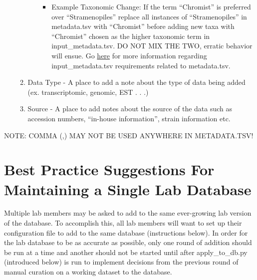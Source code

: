 \documentclass{article}
\begin{document}
\begin{itemize}
\begin{enumerate}
\begin{itemize}
                        \begin{itemize}
                            \item Example Taxonomic Change: If the term “Chromist” is preferred over “Stramenopiles” replace all instances of “Stramenopiles” in metadata.tsv with “Chromist” before adding new taxa with “Chromist” chosen as the higher taxonomic term in input\_metadata.tsv. DO NOT MIX THE TWO, erratic behavior will ensue. Go \hyperref[sec:inmeta]{here} for more information regarding input\_metadata.tsv requirements related to metadata.tsv. 
                            \end{itemize}
                    \end{itemize}
                \item Data Type - A place to add a note about the type of data being added (ex. transcriptomic, genomic, EST . . .)
                \item Source - A place to add notes about the source of the data such as accession numbers, “in-house information”, strain information etc. 
            \end{enumerate}
    \end{itemize}
     NOTE: COMMA (,) MAY NOT BE USED ANYWHERE IN METADATA.TSV!
    

    \section{Best Practice Suggestions For Maintaining a Single Lab Database}
    Multiple lab members may be asked to add to the same ever-growing lab version of
    the database. To accomplish this, all lab members will want to set up their configuration file to add to the same database (instructions below). In order for the lab database to be as accurate as possible, only one round of addition should be run at a time and another should not be started until after apply\_to\_db.py (introduced below) is run to implement decisions from the previous round of manual curation on a working dataset to the database.
    
\end{document}
